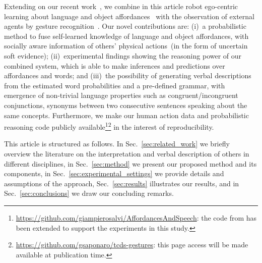 Extending on our recent work~\cite{saponaro:2017:glu}, we combine in this article robot ego-centric learning about language and object affordances~\cite{salvi:2012:smcb} with the observation of external agents by gesture recognition~\cite{saponaro:2013:crhri}.
Our novel contributions are:
(i)~a probabilistic method to fuse self-learned knowledge of language and object affordances, with socially aware information of others' physical actions~(in the form of uncertain soft evidence);
(ii)~experimental findings showing the reasoning power of our combined system, which is able to make inferences and predictions over affordances and words; and
(iii)~the possibility of generating verbal descriptions from the estimated word probabilities and a pre-defined grammar, with emergence of non-trivial language properties such as congruent/incongruent conjunctions, synonyms between two consecutive sentences speaking about the same concepts.
Furthermore, we make our human action data and probabilistic reasoning code publicly available\footnote{\url{https://github.com/giampierosalvi/AffordancesAndSpeech}: the code from \cite{salvi:2012:smcb} has been extended to support the experiments in this study.}\footnote{\url{https://github.com/gsaponaro/tcds-gestures}: this page access will be made available at publication time.} in the interest of reproducibility.

This article is structured as follows.
In Sec.~\ref{sec:related_work} we briefly overview the literature on the interpretation and verbal description of others in different disciplines,
in Sec.~\ref{sec:method} we present our proposed method and its components,
in Sec.~\ref{sec:experimental_settings} we provide details and assumptions of the approach,
Sec.~\ref{sec:results} illustrates our results, and
in Sec.~\ref{sec:conclusions} we draw our concluding remarks.
